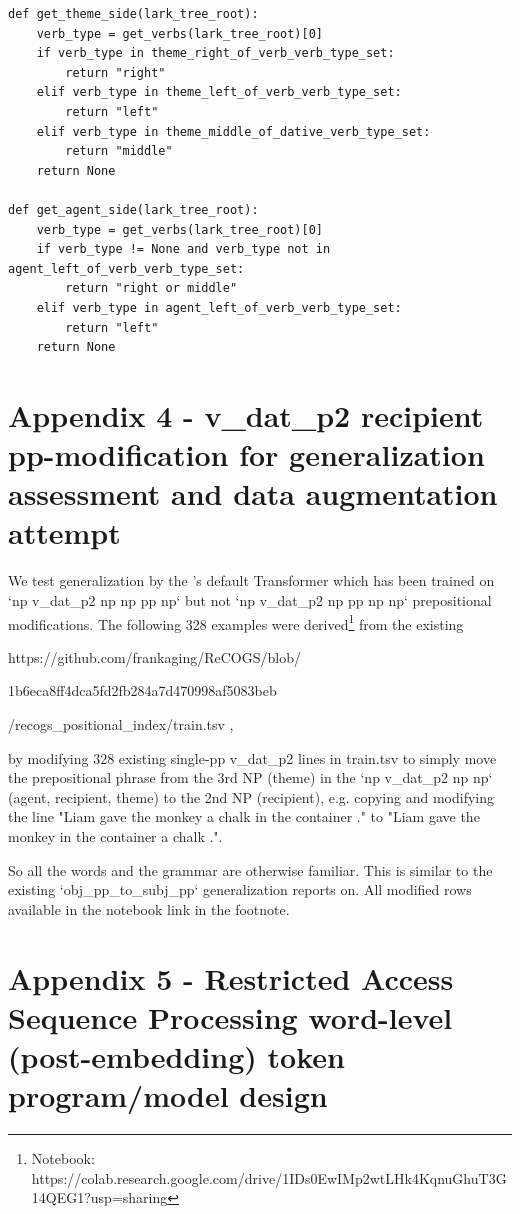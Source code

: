 \documentclass[11pt]{article}
\begin{document}
\begin{tiny}
\begin{verbatim}
def get_theme_side(lark_tree_root):
    verb_type = get_verbs(lark_tree_root)[0]
    if verb_type in theme_right_of_verb_verb_type_set:
        return "right"
    elif verb_type in theme_left_of_verb_verb_type_set:
        return "left"
    elif verb_type in theme_middle_of_dative_verb_type_set:
        return "middle"
    return None

def get_agent_side(lark_tree_root):
    verb_type = get_verbs(lark_tree_root)[0]
    if verb_type != None and verb_type not in agent_left_of_verb_verb_type_set:
        return "right or middle"
    elif verb_type in agent_left_of_verb_verb_type_set:
        return "left"
    return None
\end{verbatim}
\end{tiny}

\clearpage
\section{Appendix 4 - v\_dat\_p2 recipient pp-modification for generalization assessment and data augmentation attempt}

We test generalization by the \cite{Wu2023}'s default Transformer which has been trained on `np v\_dat\_p2 np np pp np` but not `np v\_dat\_p2 np pp np np` prepositional modifications.
The following 328 examples were derived\footnote{Notebook: https://colab.research.google.com/drive/1IDs0EwIMp2wtLHk4KqnuGhuT3G14QEG1?usp=sharing 
} from the existing

https://github.com/frankaging/ReCOGS/blob/

1b6eca8ff4dca5fd2fb284a7d470998af5083beb

/recogs\_positional\_index/train.tsv , 

by modifying 328 existing single-pp v\_dat\_p2 lines in train.tsv to simply move the prepositional phrase from the 3rd NP (theme) in the `np v\_dat\_p2 np np` (agent, recipient, theme) to the 2nd NP (recipient), e.g. copying and modifying the line "Liam gave the monkey a chalk in the container ." to "Liam gave the monkey in the container a chalk .".

So all the words and the grammar are otherwise familiar. This is similar to the existing `obj\_pp\_to\_subj\_pp` generalization \cite{Wu2023} reports on.
All modified rows available in the notebook link in the footnote.

\clearpage
\section{Appendix 5 - Restricted Access Sequence Processing word-level (post-embedding) token program/model design}
\end{document}
